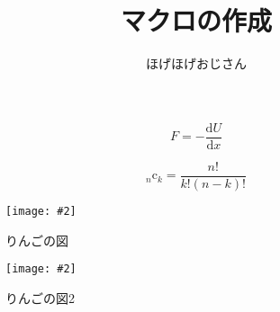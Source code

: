 \documentclass[a4paper, 11pt, uplatex]{jsarticle}
\newcommand{\combination}[2]{{}_{#1} \mathrm{c}_{#2}}
\newcommand{\myfig}[4][width=5cm]{%
\begin{figure}[htbp]
	\centering
	\texttt{[image: \#2]}
	\caption{#3} \label{fig:#4}
\end{figure}%
}
\begin{document}
\title{マクロの作成}
\author{ほげほげおじさん}
\maketitle

\[
	F = - \frac{\mathrm{d}U}{\mathrm{d}x}
\]

\[
	\combination{n}{k} = \frac{n!}{k! (n-k)!}
\]

\myfig{apple.png}{りんごの図}{apple}
\myfig[width=3cm]{apple.png}{りんごの図2}{apple2}



\nocite{*}

\end{document}
